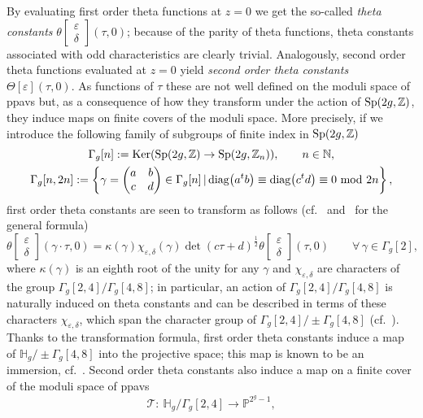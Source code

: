 \documentclass[pdftex]{sigma}
\numberwithin{equation}{section}
\newcommand{\de}{\delta}
\newcommand{\ep}{\varepsilon}
\newcommand{\HH}{{\mathbb{H}}}
\newcommand{\PP}{{\mathbb{P}}}
\newcommand{\ZZ}{{\mathbb{Z}}}
\newcommand{\NN}{{\mathbb{N}}}
\def\ZZ{{\mathbb Z}}
\def\t{\theta}
\def\T{\Theta}
\def\tt#1#2{{\t\left[\begin{matrix}{#1}\\ {#2}\end{matrix}\right]}}
\begin{document}
By evaluating first order theta functions at $z=0$ we get the so-called {\it theta constants} $\theta\left[\begin{smallmatrix}\ep \\ \de \end{smallmatrix}\right] (\tau,0)$; because of the parity of theta functions, theta constants associated with odd characteristics are clearly trivial. Analogously, second order theta functions evaluated at $z=0$ yield {\it second order theta constants} $\T[\ep](\tau,0)$. As functions of $\tau$ these are not well defined on the moduli space of ppavs but, as a consequence of how they transform under the action of ${\rm Sp}(2g, \ZZ)$, they induce maps on finite covers of the moduli space. More precisely, if we introduce the following family of subgroups of finite index in ${\rm Sp}(2g, \ZZ)$
\begin{gather*}
\Gamma_g[n]:= \operatorname{Ker}({\rm Sp}(2g,\ZZ) \to {\rm Sp}(2g,\ZZ_n)), \qquad n \in \NN,\\
\Gamma_g[n,2n]:=\left\lbrace\gamma = \begin{pmatrix} a & b \\ c & d \end{pmatrix} \in \Gamma_g[n] \,|\, {\rm diag}\big(a^tb\big)\equiv{\rm diag}
\big(c^td\big)\equiv0\ {\rm mod}\ 2n \right\rbrace,
\end{gather*}
first order theta constants are seen to transform as follows (cf.~\cite{Ig72} and~\cite{RF} for the general formula)
\[
\tt\ep\de(\gamma \cdot \tau,0) = \kappa(\gamma) \chi_{\ep,\de}(\gamma) \det{(c \tau + d)}^{\frac{1}{2}} \tt\ep\de(\tau,0) \qquad \forall\, \gamma \in \Gamma_g[2],
\]
where $\kappa(\gamma)$ is an eighth root of the unity for any $\gamma$ and $ \chi_{\ep,\de}$ are characters of the group $\Gamma_g[2,4]/\Gamma_g[4,8]$; in particular, an action of $\Gamma_g[2,4]/\Gamma_g[4,8]$ is naturally induced on theta constants and can be described in terms of these characters $ \chi_{\ep,\de}$, which span the character group of $\Gamma_g[2,4]/\pm\Gamma_g[4,8]$ (cf.~\cite{SM}). Thanks to the transformation formula, first order theta constants induce a map of $\HH_g/\pm\Gamma_g[4,8]$ into the projective space; this map is known to be an immersion, cf.~\cite{Ig72}. Second order theta constants also induce a map on a finite cover of the moduli space of ppavs
\[
\mathcal{T}\colon \ \HH_g /\Gamma_g[2,4] \to \PP^{2^g-1},
\]
\end{document}
